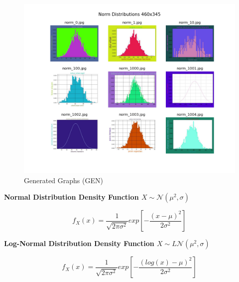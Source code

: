 \documentclass[12pt]{article}
\begin{document}
            \begin{figure}[ht]
            
                \begin{center}

                    \includegraphics[scale=0.6]{norm_460x345_overview.png}
                    \caption{Generated Graphs (GEN)}
                    \label{generated-overview}
        
                \end{center}
                
            \end{figure}

            \textbf{Normal Distribution Density Function  $ X \sim \mathcal{N}(\mu^2, \sigma)  $}
               
            \begin{Large} 

                \[ f_X(x) = \frac{1}{\sqrt{2\pi \sigma^2}} exp\left[{-\frac{(x - \mu)^2}{2 \sigma^2}}\right] \] 

            \end{Large}

            \textbf{Log-Normal Distribution Density Function  $ X \sim L\mathcal{N}(\mu^2, \sigma) $}

            \begin{Large} 

                \[ f_X(x) = \frac{1}{\sqrt{2\pi \sigma^2}} exp\left[{-\frac{(log(x) - \mu)^2}{2 \sigma^2}}\right] \] 

            \end{Large}
\end{document}
